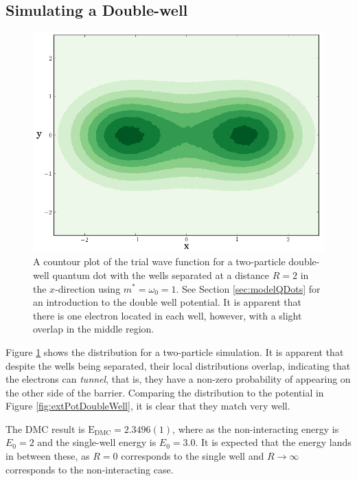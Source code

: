 \subsection{Simulating a Double-well}

\begin{figure}[h]
 \begin{center}
 \includegraphics[scale=0.35]{../Graphics/DoubleWell.png}
  \caption{A countour plot of the trial wave function for a two-particle double-well quantum dot with the wells separated at a distance $R = 2$ in the $x$-direction using $m^\ast = \omega_0 = 1$. See Section \ref{sec:modelQDots} for an introduction to the double well potential. It is apparent that there is one electron located in each well, however, with a slight overlap in the middle region.}
  \label{fig:doubleWell}
 \end{center}
\end{figure}
\captionsetup[subfloat]{labelformat=parens}

Figure \ref{fig:doubleWell} shows the distribution for a two-particle simulation. It is apparent that despite the wells being separated, their local distributions overlap, indicating that the electrons can \textit{tunnel}, that is, they have a non-zero probability of appearing on the other side of the barrier. Comparing the distribution to the potential in Figure \ref{fig:extPotDoubleWell}, it is clear that they match very well.

The DMC result is $\mathrm{E_{DMC}} = 2.3496(1)$, where as the non-interacting energy is $E_0 = 2$ and the single-well energy is $E_0=3.0$. It is expected that the energy lands in between these, as $R=0$ corresponds to the single well and $R\to\infty$ corresponds to the non-interacting case. 
